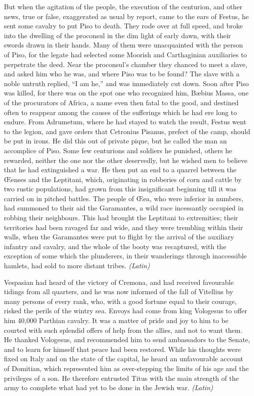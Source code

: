 
But when the agitation of the people, the execution of the centurion, and other news, true or false, exaggerated as usual by report, came to the ears of Festus, he sent some cavalry to put Piso to death. They rode over at full speed, and broke into the dwelling of the proconsul in the dim light of early dawn, with their swords drawn in their hands. Many of them were unacquainted with the person of Piso, for the legate had selected some Moorish and Carthaginian auxiliaries to perpetrate the deed. Near the proconsul's chamber they chanced to meet a slave, and asked him who he was, and where Piso was to be found? The slave with a noble untruth replied, ``I am he,'' and was immediately cut down. Soon after Piso was killed, for there was on the spot one who recognized him, Bæbius Massa, one of the procurators of Africa, a name even then fatal to the good, and destined often to reappear among the causes of the sufferings which he had ere long to endure. From Adrumetum, where he had stayed to watch the result, Festus went to the legion, and gave orders that Cetronius Pisanus, prefect of the camp, should be put in irons. He did this out of private pique, but he called the man an accomplice of Piso. Some few centurions and soldiers he punished, others he rewarded, neither the one nor the other deservedly, but he wished men to believe that he had extinguished a war. He then put an end to a quarrel between the Œenses and the Leptitani, which, originating in robberies of corn and cattle by two rustic populations, had grown from this insignificant beginning till it was carried on in pitched battles. The people of Œea, who were inferior in numbers, had summoned to their aid the Garamantes, a wild race incessantly occupied in robbing their neighbours. This had brought the Leptitani to extremities; their territories had been ravaged far and wide, and they were trembling within their walls, when the Garamantes were put to flight by the arrival of the auxiliary infantry and cavalry, and the whole of the booty was recaptured, with the exception of some which the plunderers, in their wanderings through inaccessible hamlets, had sold to more distant tribes. \emph{(Latin)}


Vespasian had heard of the victory of Cremona, and had received favourable tidings from all quarters, and he was now informed of the fall of Vitellius by many persons of every rank, who, with a good fortune equal to their courage, risked the perils of the wintry sea. Envoys had come from king Vologesus to offer him 40,000 Parthian cavalry. It was a matter of pride and joy to him to be courted with such splendid offers of help from the allies, and not to want them. He thanked Vologesus, and recommended him to send ambassadors to the Senate, and to learn for himself that peace had been restored. While his thoughts were fixed on Italy and on the state of the capital, he heard an unfavourable account of Domitian, which represented him as over-stepping the limits of his age and the privileges of a son. He therefore entrusted Titus with the main strength of the army to complete what had yet to be done in the Jewish war. \emph{(Latin)}

